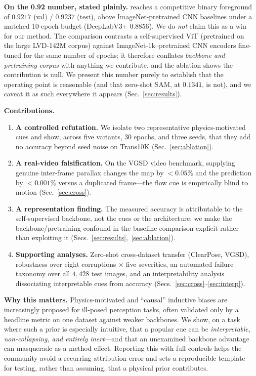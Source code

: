 \textbf{On the 0.92 number, stated plainly.} \spectra{} reaches a competitive
binary foreground \iou{} of $0.9217$ (val) / $0.9237$ (test), above
ImageNet-pretrained CNN baselines under a matched 10-epoch budget
(DeepLabV3+ $0.8856$). We do \emph{not} claim this as a win for our method. The
comparison contrasts a \dinov{} self-supervised ViT (pretrained on the large
LVD-142M corpus) against ImageNet-1k--pretrained CNN encoders fine-tuned for the
same number of epochs; it therefore conflates \emph{backbone and pretraining
corpus} with anything we contribute, and the ablation shows the contribution is
null. We present this number purely to establish that the operating point is
reasonable (and that zero-shot SAM, at $0.1341$, is not), and we caveat it as
such everywhere it appears (Sec.~\ref{sec:results}).

\textbf{Contributions.}
\begin{enumerate}
\item \textbf{A controlled refutation.} We isolate two representative
physics-motivated cues and show, across five variants, 30 epochs, and three
seeds, that they add no accuracy beyond seed noise on Trans10K
(Sec.~\ref{sec:ablation}).
\item \textbf{A real-video falsification.} On the VGSD video benchmark, supplying
genuine inter-frame parallax changes the \ofcv{} map by $<0.05\%$ and the
prediction by $<0.001\%$ versus a duplicated frame---the flow cue is empirically
blind to motion (Sec.~\ref{sec:cross}).
\item \textbf{A representation finding.} The measured accuracy is attributable to
the self-supervised backbone, not the cues or the architecture; we make the
backbone/pretraining confound in the baseline comparison explicit rather than
exploiting it (Secs.~\ref{sec:results},~\ref{sec:ablation}).
\item \textbf{Supporting analyses.} Zero-shot cross-dataset transfer (ClearPose,
VGSD), robustness over eight corruptions $\times$ five severities, an automated
failure taxonomy over all $4{,}428$ test images, and an interpretability
analysis dissociating interpretable cues from accuracy
(Secs.~\ref{sec:cross}--\ref{sec:interp}).
\end{enumerate}

\textbf{Why this matters.} Physics-motivated and ``causal'' inductive biases are
increasingly proposed for ill-posed perception tasks, often validated only by a
headline metric on one dataset against weaker backbones. We show, on a task
where such a prior is especially intuitive, that a popular cue can be
\emph{interpretable, non-collapsing, and entirely inert}---and that an
unexamined backbone advantage can masquerade as a method effect. Reporting this
with full controls helps the community avoid a recurring attribution error and
sets a reproducible template for testing, rather than assuming, that a physical
prior contributes.


